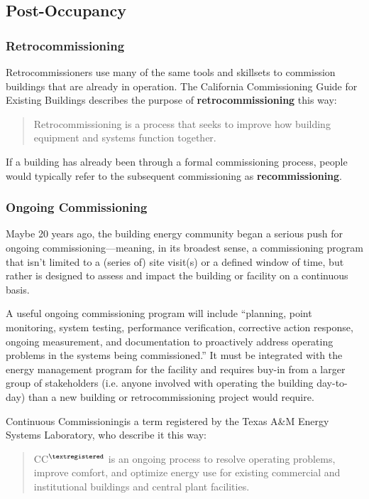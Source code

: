 \documentclass[10pt]{article}
\begin{document}
\subsection{Post-Occupancy}

\subsubsection{Retrocommissioning}

Retrocommissioners use many of the same tools and skillsets to commission buildings that are already in operation. The California Commissioning Guide for Existing Buildings describes the purpose of \textbf{retrocommissioning} this way:

\begin{quote}
    Retrocommissioning is a process that seeks to improve how building equipment and systems function together. \cite{cx-existing}
\end{quote}

If a building has already been through a formal commissioning process, people would typically refer to the subsequent commissioning as \textbf{recommissioning}.

\subsubsection{Ongoing Commissioning}

Maybe 20 years ago, the building energy community began a serious push for ongoing commissioning---meaning, in its broadest sense, a commissioning program that isn't limited to a (series of) site visit(s) or a defined window of time, but rather is designed to assess and impact the building or facility on a continuous basis.

A useful ongoing commissioning program will include ``planning, point monitoring, system testing, performance verification, corrective action response, ongoing measurement, and documentation to proactively address operating problems in the systems being commissioned.'' \cite{noauthor_undated-jw} It must be integrated with the energy management program for the facility and requires buy-in from a larger group of stakeholders (i.e. anyone involved with operating the building day-to-day) than a new building or retrocommissioning project would require.

Continuous Commissioning\textregistered is a term registered by the Texas A\&M Energy Systems Laboratory, who describe it this way:

\begin{quote}
    CC$^{\textregistered}$ is an ongoing process to resolve operating problems, improve comfort, and optimize energy use for existing commercial and institutional buildings and central plant facilities. \cite{noauthor_undated-gq}
\end{quote}
\end{document}
